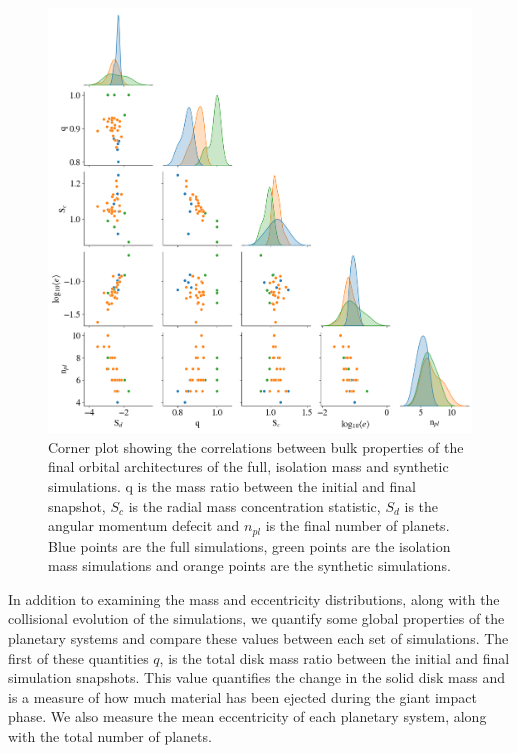 \begin{figure}
\begin{center}
    \includegraphics[width=\textwidth]{figures/stip/corner_full_syn_iso.png}
    \caption{Corner plot showing the correlations between bulk properties of the final orbital architectures of the full, isolation mass and synthetic simulations. q is the mass ratio between the initial and final snapshot, $S_{c}$ is the radial mass concentration statistic, $S_{d}$ is the angular momentum defecit and $n_{pl}$ is the final number of planets. Blue points are the full simulations, green points are the isolation mass simulations and orange points are the synthetic simulations.\label{fig:corner_full_syn_iso}}
\end{center}
\end{figure}

In addition to examining the mass and eccentricity distributions, along with the collisional evolution of the simulations, we quantify some global properties of the planetary systems and compare these values between each set of simulations. The first of these quantities $q$, is the total disk mass ratio between the initial and final simulation snapshots. This value quantifies the change in the solid disk mass and is a measure of how much material has been ejected during the giant impact phase. We also measure the mean eccentricity of each planetary system, along with the total number of planets.

